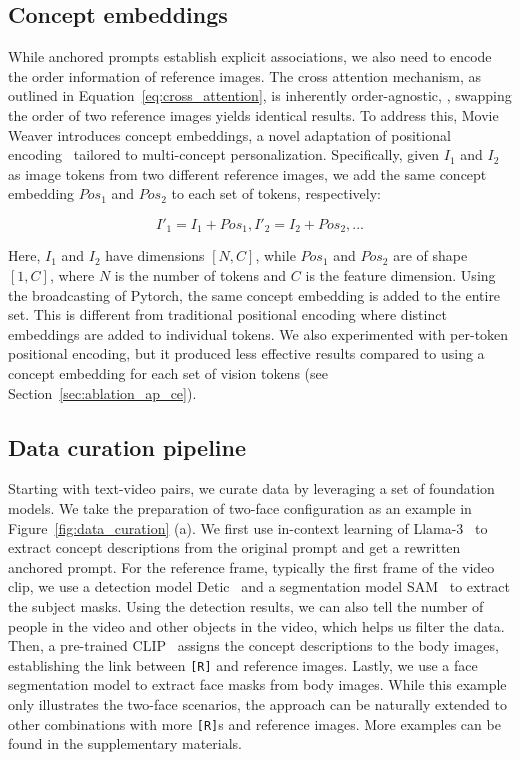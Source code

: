 \subsection{Concept embeddings}


While anchored prompts establish explicit associations, we also need to encode the order information of reference images. 
The cross attention mechanism, as outlined in Equation~\ref{eq:cross_attention}, is inherently order-agnostic, \ie, swapping the order of two reference images yields identical results.
To address this, Movie Weaver introduces concept embeddings, a novel adaptation of positional encoding~\cite{vaswani2017attention} tailored to multi-concept personalization. 
Specifically, given $I_1$ and $I_2$ as image tokens from two different reference images, we add the same concept embedding $Pos_1$ and $Pos_2$  to each set of tokens, respectively:


\begin{equation}
I'_1 = I_1 + Pos_1,  I'_2 = I_2 + Pos_2, ...
\label{eq:concept_embedding}
\end{equation}


Here, $I_1$ and $I_2$ have dimensions $[N, C]$, while $Pos_1$ and $Pos_2$ are of shape $[1, C]$, where $N$ is the number of tokens and $C$ is the feature dimension. Using the broadcasting of Pytorch, the same concept embedding is added to the entire set. 
This is different from traditional positional encoding where distinct embeddings are added to individual tokens.
We also experimented with per-token positional encoding, but it produced less effective results compared to using a concept embedding for each set of vision tokens (see Section~\ref{sec:ablation_ap_ce}). 


\subsection{Data curation pipeline}
\label{sec:overall_architecture}

Starting with text-video pairs, we curate data by leveraging a set of foundation models.
We take the preparation of two-face configuration as an example in Figure~\ref{fig:data_curation} (a). 
We first use in-context learning of Llama-3~\cite{dubey2024llama} to extract concept descriptions from the original prompt and get a rewritten anchored prompt. 
For the reference frame, typically the first frame of the video clip, we use a detection model Detic~\cite{zhou2022detecting} and a segmentation model SAM~\cite{kirillov2023segment} to extract the subject masks.
Using the detection results, we can also tell the number of people in the video and other objects in the video, which helps us filter the data.
Then, a pre-trained CLIP~\cite{radford2021learning} assigns the concept descriptions to the body images, establishing the link between \texttt{[R]} and reference images. Lastly, we use a face segmentation model to extract face masks from body images.
While this example only illustrates the two-face scenarios, the approach can be naturally extended to other combinations with more \texttt{[R]}s and reference images. 
More examples can be found in the supplementary materials. 

